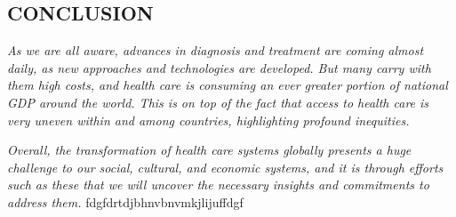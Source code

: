 \documentclass[12pt]{article}
\begin{document}
\begin{flushleft}

\section{CONCLUSION}



\textit{\large  As we are all aware, advances in diagnosis and treatment are coming almost daily, as new approaches and technologies are developed. But many carry with them high costs, and health care is consuming an ever greater portion of national GDP around the world. This is on top of the fact that access to health care is very uneven within and among countries, highlighting profound inequities.}

\textit{\large   Overall, the transformation of health care systems globally presents a huge challenge to our social, cultural, and economic systems, and it is through efforts such as these that we will uncover the necessary insights and commitments to address them.}   
fdgfdrtdjbhnvbnvmkjlijuffdgf
\end{flushleft}
\end{document}
